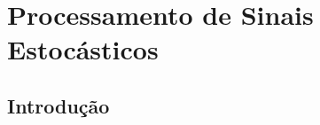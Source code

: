 \chapter{Processamento de Sinais Estocásticos}
\label{cap:processamento_sinais_estocasticos}


\section{Introdução}
\label{sec:processamento_sinais_estocasticos_introducao}
